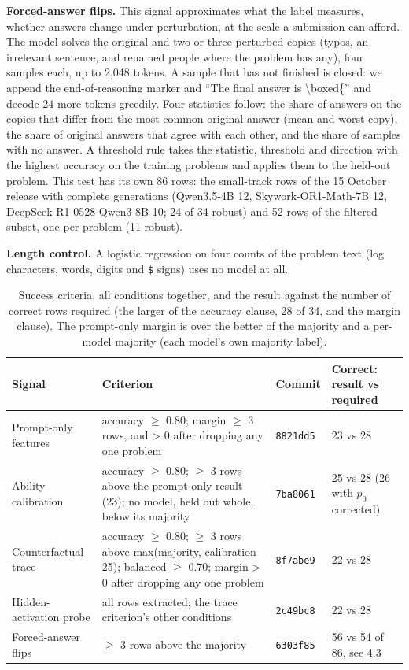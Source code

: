 \documentclass{article}
\begin{document}
\textbf{Forced-answer flips.} This signal approximates what the label measures, whether answers change under perturbation, at the scale a submission can afford. The model solves the original and two or three perturbed copies (typos, an irrelevant sentence, and renamed people where the problem has any), four samples each, up to 2,048 tokens. A sample that has not finished is closed: we append the end-of-reasoning marker and ``The final answer is \textbackslash boxed\{'' and decode 24 more tokens greedily. Four statistics follow: the share of answers on the copies that differ from the most common original answer (mean and worst copy), the share of original answers that agree with each other, and the share of samples with no answer. A threshold rule takes the statistic, threshold and direction with the highest accuracy on the training problems and applies them to the held-out problem. This test has its own 86 rows: the small-track rows of the 15 October release with complete generations (Qwen3.5-4B 12, Skywork-OR1-Math-7B 12, DeepSeek-R1-0528-Qwen3-8B 10; 24 of 34 robust) and 52 rows of the filtered subset, one per problem (11 robust).

\textbf{Length control.} A logistic regression on four counts of the problem text (log characters, words, digits and \texttt{\$} signs) uses no model at all.

\begin{table}[t]
\centering
\small
\caption{Success criteria, all conditions together, and the result against the number of correct rows required (the larger of the accuracy clause, 28 of 34, and the margin clause). The prompt-only margin is over the better of the majority and a per-model majority (each model's own majority label).}\label{tab:criteria}
\begin{tabular}{@{}p{2.6cm}p{6.1cm}p{1.4cm}p{2.5cm}@{}}
\toprule
Signal & Criterion & Commit & Correct: result vs required \\
\midrule
Prompt-only features & accuracy \ensuremath{\geq} 0.80; margin \ensuremath{\geq} 3 rows, and \textgreater{} 0 after dropping any one problem & \texttt{8821dd5} & 23 vs 28 \\
Ability calibration & accuracy \ensuremath{\geq} 0.80; \ensuremath{\geq} 3 rows above the prompt-only result (23); no model, held out whole, below its majority & \texttt{7ba8061} & 25 vs 28 (26 with $p_0$ corrected) \\
Counterfactual trace & accuracy \ensuremath{\geq} 0.80; \ensuremath{\geq} 3 rows above max(majority, calibration 25); balanced \ensuremath{\geq} 0.70; margin \textgreater{} 0 after dropping any one problem & \texttt{8f7abe9} & 22 vs 28 \\
Hidden-activation probe & all rows extracted; the trace criterion's other conditions & \texttt{2c49bc8} & 22 vs 28 \\
Forced-answer flips & \ensuremath{\geq} 3 rows above the majority & \texttt{6303f85} & 56 vs 54 of 86, see 4.3 \\
\bottomrule
\end{tabular}
\end{table}
\end{document}
